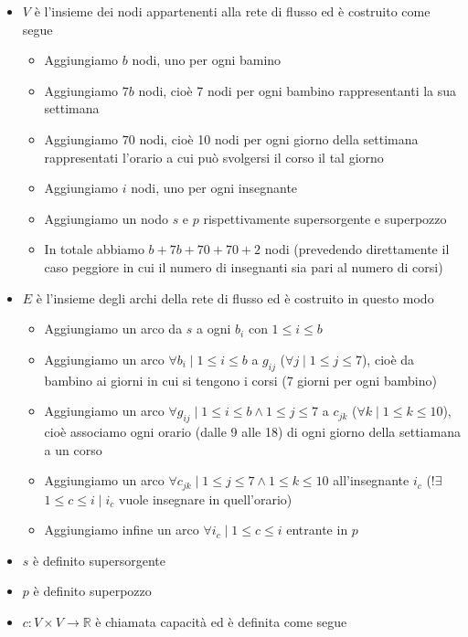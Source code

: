 \documentclass[../cheatSheetAlgoritmi.tex]{subfiles}
\begin{document}
\begin{itemize}
	\item $V$ è l'insieme dei nodi appartenenti alla rete di flusso ed è costruito come segue 
	\begin{itemize}
		\item Aggiungiamo $b$ nodi, uno per ogni bamino
		\item Aggiungiamo $7b$ nodi, cioè 7 nodi per ogni bambino rappresentanti la sua settimana
		\item Aggiungiamo $70$ nodi, cioè 10 nodi per ogni giorno della settimana rappresentati l'orario a cui può svolgersi il corso il tal giorno
		\item Aggiungiamo $i$ nodi, uno per ogni insegnante
		\item Aggiungiamo un nodo $s$ e $p$ rispettivamente supersorgente e superpozzo
		\item In totale abbiamo $b + 7b + 70 + 70 + 2$ nodi (prevedendo direttamente il caso peggiore in cui il numero di insegnanti sia pari al numero di corsi)
	\end{itemize}
	\item $E$ è l'insieme degli archi della rete di flusso ed è costruito in questo modo
	\begin{itemize}
		\item Aggiungiamo un arco da $s$ a ogni $b_{i}$ con $1 \leq i \leq b$
		\item Aggiungiamo un arco $\forall b_{i} \mid 1 \leq i \leq b$ a $g_{ij}$ ($ \forall j \mid 1\leq j \leq 7$), cioè da bambino ai giorni in cui si tengono i corsi (7 giorni per ogni bambino)
		\item Aggiungiamo un arco $\forall  g_{ij} \mid 1 \leq i \leq b \land 1 \leq j \leq 7$ a $c_{jk}$ ($\forall k \mid 1 \leq k \leq 10$), cioè associamo ogni orario (dalle 9 alle 18) di ogni giorno della settiamana a un corso
		\item Aggiungiamo un arco $\forall  c_{jk} \mid 1 \leq j \leq 7 \land 1 \leq k \leq 10$ all'insegnante $i_{c}$ (!$\exists$ $1 \leq c \leq i \mid i_{c}$ vuole insegnare in quell'orario)
		\item Aggiungiamo infine un arco $\forall i_{c} \mid 1 \leq c \leq i$ entrante in $p$
	\end{itemize}
	\item $s$ è definito supersorgente
	\item $p$ è definito superpozzo
	\item $c: V \times V \rightarrow \mathbb{R}$ è chiamata capacità ed è definita come segue
	\begin{itemize}

\end{itemize}
\end{itemize}
\end{document}
